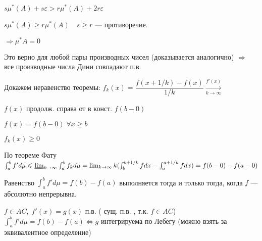 $s \mu^* (A) + s \varepsilon > r \mu^* (A) + 2 r \varepsilon$

$s \mu^* (A) \geqslant r \mu^* (A) \quad s \geqslant r$ ---
противоречие.

$\Rightarrow \mu^* A = 0$

Это верно для любой пары производных чисел (доказывается
аналогично) $\Rightarrow$ все производные числа Дини совпадают
п.в.

Докажем неравенство теоремы: $f_k(x) = \dfrac{f(x + 1/k) -
f(x)}{1/k} \xrightarrow[k \rightarrow \infty]{f'(x)}$

$f(x)$ продолж. справа от в конст. $f(b-0)$

%
%
%
%
%
%
%
%
%
%
%

$f(x) = f(b-0) \; \forall x \geqslant b$

$f_k(x) \geqslant 0$

По теореме Фату  $\int_a^b f' d \mu \leqslant \varliminf_{k
\rightarrow \infty} \int_a^b f_k d \mu = \lim_{k \rightarrow
\infty} k (\int_b^{b + 1/k} f d x - \int_a^{a + 1/k} f dx) = f(b -
0) - f(a - 0)$

Равенство  $\int_a^b f'd \mu = f(b) - f(a)$ выполняется тогда и
только тогда, когда $f$ --- абсолютно непрерывна.

$f \in AC, \; f'(x) = g(x)$ п.в. ( сущ. п.в. , т.к. $f \in AC$)
$\int_a^b f' d \mu = f(b) - f(a) \Leftrightarrow g$ интегрируема
по Лебегу (можно взять за эквивалентное определение)
